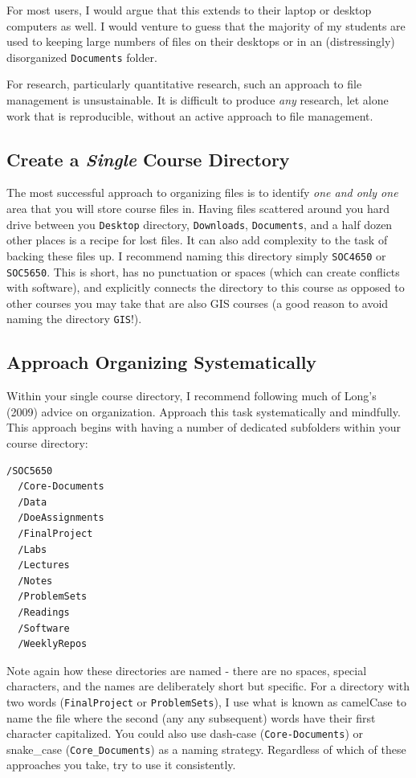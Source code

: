 \documentclass[]{book}
\begin{document}
For most users, I would argue that this extends to their laptop or
desktop computers as well. I would venture to guess that the majority of
my students are used to keeping large numbers of files on their desktops
or in an (distressingly) disorganized \texttt{Documents} folder.

For research, particularly quantitative research, such an approach to
file management is unsustainable. It is difficult to produce \emph{any}
research, let alone work that is reproducible, without an active
approach to file management.

\subsection{\texorpdfstring{Create a \emph{Single} Course
Directory}{Create a Single Course Directory}}\label{create-a-single-course-directory}

The most successful approach to organizing files is to identify
\emph{one and only one} area that you will store course files in. Having
files scattered around you hard drive between you \texttt{Desktop}
directory, \texttt{Downloads}, \texttt{Documents}, and a half dozen
other places is a recipe for lost files. It can also add complexity to
the task of backing these files up. I recommend naming this directory
simply \texttt{SOC4650} or \texttt{SOC5650}. This is short, has no
punctuation or spaces (which can create conflicts with software), and
explicitly connects the directory to this course as opposed to other
courses you may take that are also GIS courses (a good reason to avoid
naming the directory \texttt{GIS}!).

\subsection{Approach Organizing
Systematically}\label{approach-organizing-systematically}

Within your single course directory, I recommend following much of
Long's (2009) advice on organization. Approach this task systematically
and mindfully. This approach begins with having a number of dedicated
subfolders within your course directory:

\begin{verbatim}
/SOC5650
  /Core-Documents
  /Data
  /DoeAssignments
  /FinalProject
  /Labs
  /Lectures
  /Notes
  /ProblemSets
  /Readings
  /Software
  /WeeklyRepos
\end{verbatim}

Note again how these directories are named - there are no spaces,
special characters, and the names are deliberately short but specific.
For a directory with two words (\texttt{FinalProject} or
\texttt{ProblemSets}), I use what is known as camelCase to name the file
where the second (any any subsequent) words have their first character
capitalized. You could also use dash-case (\texttt{Core-Documents}) or
snake\_case (\texttt{Core\_Documents}) as a naming strategy. Regardless
of which of these approaches you take, try to use it consistently.
\end{document}
